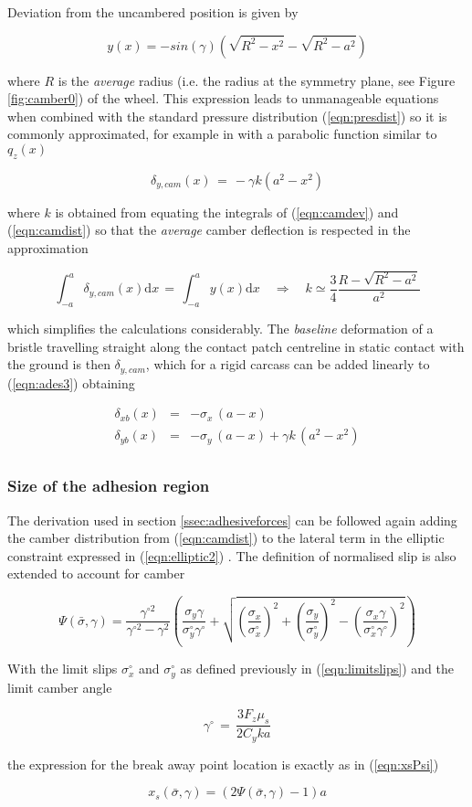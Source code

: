 \documentclass[12pt,a4paper]{report}
\newcommand{\eq}[2]{
\begin{equation} \label{#1}
#2
\end{equation}
}
\newcommand{\req}[1]{
(\ref{#1})
}
\newcommand{\de}[1]{
\mathrm{d} #1 
}
\begin{document}
Deviation from the uncambered position is given by
\eq{eqn:camdev}{y(x) = -sin(\gamma)(\sqrt{R^2-x^2} - \sqrt{R^2-a^2})}
where $R$ is the \emph{average} radius (i.e. the radius at the symmetry plane, see Figure \ref{fig:camber0}) of the wheel.
This expression leads to unmanageable equations when combined with the standard pressure distribution \req{eqn:presdist} so it is commonly approximated, for example in \citep{nikravesh} with a parabolic function similar to $q_z(x)$
\eq{eqn:camdist}{\delta_{y,cam}(x) \, =\, -\gamma k (a^2 - x^2)}
where $k$ is obtained from equating the integrals of \req{eqn:camdev} and \req{eqn:camdist} so that the \emph{average} camber deflection is respected in the approximation
\eq{eqn:camkfactor}{\int_{-a}^{a} \delta_{y,cam}(x) \de{x} \, = \, \int_{-a}^{a} y(x) \de{x} \quad \Rightarrow \quad 
					k \simeq \frac{3}{4} \frac{R-\sqrt{R^2-a^2}}{a^2}}
which simplifies the calculations considerably. The \emph{baseline} deformation of a bristle travelling straight along the contact patch centreline in static contact with the ground is then $\delta_{y,cam}$, which for a rigid carcass can be added linearly to \req{eqn:ades3} obtaining
\eq{eqn:camdeltas}{
\begin{array}{rcl}
\delta_{xb}(x)  &=& -\sigma_x \, (a-x) \\
\delta_{yb}(x)  &=& -\sigma_y \, (a-x) + \gamma k \, (a^2 -x^2) \\
\end{array}
}

\subsubsection*{Size of the adhesion region}
The derivation used in section \ref{ssec:adhesiveforces} can be followed again adding the camber distribution from \req{eqn:camdist} to the lateral term in the elliptic constraint expressed in \req{eqn:elliptic2}.
The definition of normalised slip is also extended to account for camber

\eq{eqn:PSI2}{\Psi(\bar{\sigma},\gamma) = \frac{\gamma^{\circ 2}}{\gamma^{\circ 2} - \gamma^2}
				\left(\frac{\sigma_y \gamma}{\sigma^\circ_y \gamma^\circ} + \sqrt{\left(\frac{\sigma_x}{\sigma^\circ_x}\right)^2+
				\left(\frac{\sigma_y}{\sigma^\circ_y}\right)^2 - \left(\frac{\sigma_x \gamma}{\sigma^\circ_x \gamma^\circ}\right)^2}\right)}

With the limit slips $\sigma^\circ_x$ and $\sigma^\circ_y$ as defined previously in \req{eqn:limitslips} and the limit camber angle
\eq{eqn:limcam}{\gamma^\circ \, = \, \frac{3F_z\mu_{s}}{2C_yka}}
the expression for the break away point location is exactly as in \req{eqn:xsPsi}
\eq{eqn:xsPsi2}{x_s(\bar{\sigma},\gamma) = (2\Psi(\bar{\sigma},\gamma) - 1)a}
\end{document}
